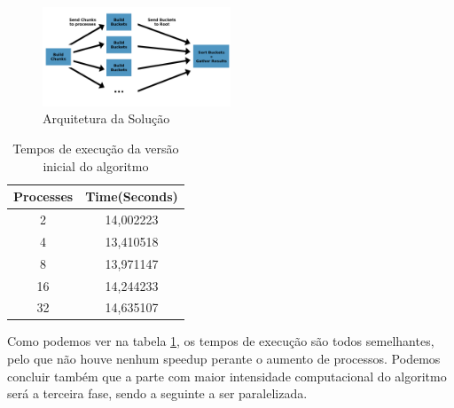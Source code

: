 \documentclass[a4paper]{report}
\begin{document}
\begin{figure}[h]
    \centering
    \includegraphics[width=0.5\textwidth]{images/esquemas/algoritmo_graph1.png}
    \caption{Arquitetura da Solução}
\end{figure}

\begin{table}[h]
    \centering
    \begin{tabular}{|c|c|}
        \hline
        Processes & Time(Seconds) \\ \hline
        2         & 14,002223     \\ \hline
        4         & 13,410518     \\ \hline
        8         & 13,971147     \\ \hline
        16        & 14,244233     \\ \hline
        32        & 14,635107     \\ \hline
    \end{tabular}
    \caption{Tempos de execução da versão inicial do algoritmo}
    \label{tab:oldtimes}
\end{table}

Como podemos ver na tabela \ref{tab:oldtimes}, os tempos de execução são todos
semelhantes, pelo que não houve nenhum speedup perante o aumento de processos.
Podemos concluir também que a parte com maior intensidade computacional do
algoritmo será a terceira fase, sendo a seguinte a ser paralelizada.
\end{document}
